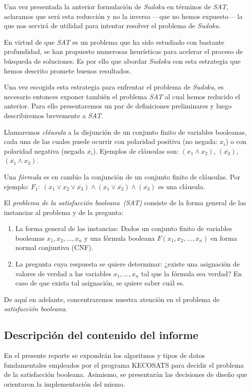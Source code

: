 \documentclass[12pt,lettersize,oneside]{article}
\begin{document}
Una vez presentada la anterior formulación de \emph{Sudoku} en términos de
\emph{SAT}, aclaramos que será esta reducción y no la inversa ---que no hemos
expuesto--- la que nos servirá de utilidad para intentar resolver el problema de
\emph{Sudoku}.

En virtud de que \emph{SAT} es un problema que ha sido estudiado con bastante
profundidad, se han propuesto numerosas heurísticas para acelerar el proceso de
búsqueda de soluciones. Es por ello que abordar \emph{Sudoku} con esta
estrategia que hemos descrito promete buenos resultados.

Una vez escogida esta estrategia para enfrentar el problema de \emph{Sudoku}, es
necesario entonces exponer también el problema \emph{SAT} al cual hemos
reducido el anterior. Para ello presentaremos un par de definiciones
preliminares y luego describiremos brevemente a \emph{SAT}.

 Llamaremos \emph{cláusula} a la disjunción de un conjunto finito de
variables booleanas, cada una de las cuales puede ocurrir con polaridad positiva
(no negada: $x_i$) o con polaridad negativa (negada $\overline{x_i}$).  Ejemplos
de cláusulas son: $(x_1 \wedge x_2)$, $(\overline{x_3})$, $(\overline{x_1}
\wedge x_3)$.

Una \emph{fórmula} es en cambio la conjunción de un conjunto finito de
cláusulas. Por ejemplo: $F_1:\ (x_1 \vee x_2 \vee \overline{x_3}) \wedge (x_1
\vee \overline{x_2}) \wedge (\overline{x_3})$ es una cláusula.

El \emph{problema de la satisfacción booleana~(SAT)} consiste de la
forma general de las instancias al problema y de la pregunta: \vspace{-2.5mm}
\begin{enumerate}
\item La forma general de las instancias: Dados un conjunto finito de variables
  booleanas $x_1,x_2,\ldots,x_n$ y una fórmula booleana $F(x_1,x_2,\ldots,x_n)$
  en forma normal conjuntiva (CNF).
\item La pregunta cuya respuesta se quiere determinar: ¿existe una asignación de
  valores de verdad a las variables $x_1,\ldots, x_n$ tal que la fórmula sea
  verdad? En caso de que exista tal asignación, se quiere saber cuál es.
\end{enumerate}

De aquí en adelante, concentraremos nuestra atención en el problema de
\emph{satisfacción booleana}.

\subsection{Descripción del contenido del informe}
En el presente reporte se expondrán los algoritmos y tipos de datos
fundamentales empleados por el programa KECOSATS para decidir el problema de la
satisfacción booleana. Asimismo, se presentarán las decisiones de diseño que
orientaron la implementación del mismo.
\end{document}
